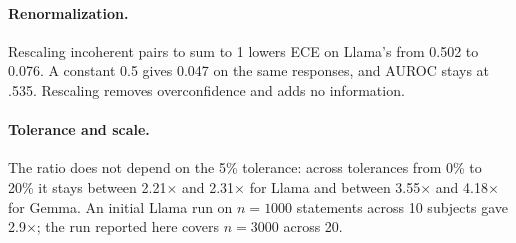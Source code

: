 \paragraph{Renormalization.} Rescaling incoherent pairs to sum to 1 lowers ECE on Llama's from 0.502 to 0.076. A constant 0.5 gives 0.047 on the same responses, and AUROC stays at .535. Rescaling removes overconfidence and adds no information.

\paragraph{Tolerance and scale.} The ratio does not depend on the 5\% tolerance: across tolerances from 0\% to 20\% it stays between 2.21$\times$ and 2.31$\times$ for Llama and between 3.55$\times$ and 4.18$\times$ for Gemma. An initial Llama run on $n=1000$ statements across 10 subjects gave 2.9$\times$; the run reported here covers $n=3000$ across 20.
